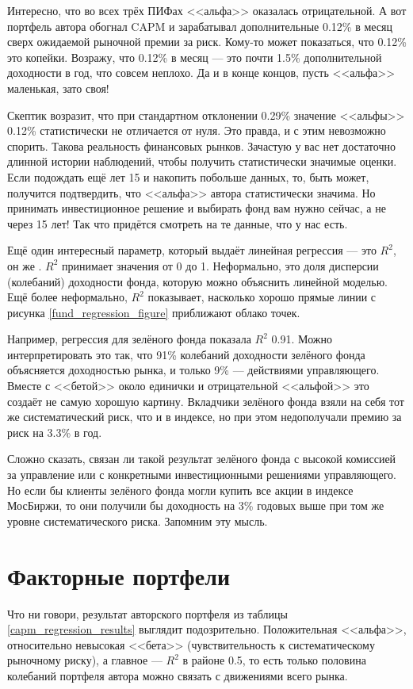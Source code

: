 Интересно, что во всех трёх ПИФах <<альфа>> оказалась отрицательной. А вот портфель автора обогнал CAPM и зарабатывал дополнительные 0.12\% в месяц сверх ожидаемой рыночной премии за риск. Кому-то может показаться, что 0.12\% это копейки. Возражу, что 0.12\% в месяц --- это почти 1.5\% дополнительной доходности в год, что совсем неплохо. Да и в конце концов, пусть <<альфа>> маленькая, зато своя!

Скептик возразит, что при стандартном отклонении 0.29\% значение <<альфы>> 0.12\% статистически не отличается от нуля. Это правда, и с этим невозможно спорить. Такова реальность финансовых рынков. Зачастую у вас нет достаточно длинной истории наблюдений, чтобы получить статистически значимые оценки. Если подождать ещё лет 15 и накопить побольше данных, то, быть может, получится подтвердить, что <<альфа>> автора статистически значима. Но принимать инвестиционное решение и выбирать фонд вам нужно сейчас, а не через 15 лет! Так что придётся смотреть на те данные, что у нас есть.

Ещё один интересный параметр, который выдаёт линейная регрессия --- это $R^2$, он же . $R^2$ принимает значения от 0 до 1. Неформально, это доля дисперсии (колебаний) доходности фонда, которую можно объяснить линейной моделью. Ещё более неформально, $R^2$ показывает, насколько хорошо прямые линии с рисунка \ref{fund_regression_figure} приближают облако точек.

Например, регрессия для зелёного фонда показала $R^2$ 0.91. Можно интерпретировать это так, что 91\% колебаний доходности зелёного фонда объясняется доходностью рынка, и только 9\% --- действиями управляющего. Вместе с <<бетой>> около единички и отрицательной <<альфой>> это создаёт не самую хорошую картину. Вкладчики зелёного фонда взяли на себя тот же систематический риск, что и в индексе, но при этом недополучали премию за риск на 3.3\% в год. 

Сложно сказать, связан ли такой результат зелёного фонда с высокой комиссией за управление или с конкретными инвестиционными решениями управляющего. Но если бы клиенты зелёного фонда могли купить все акции в индексе МосБиржи, то они получили бы доходность на 3\% годовых выше при том же уровне систематического риска. Запомним эту мысль.

\section*{Факторные портфели}

Что ни говори, результат авторского портфеля из таблицы \ref{capm_regression_results} выглядит подозрительно. Положительная <<альфа>>, относительно невысокая <<бета>> (чувствительность к систематическому рыночному риску), а главное --- $R^2$ в районе 0.5, то есть только половина колебаний портфеля автора можно связать с движениями всего рынка.

